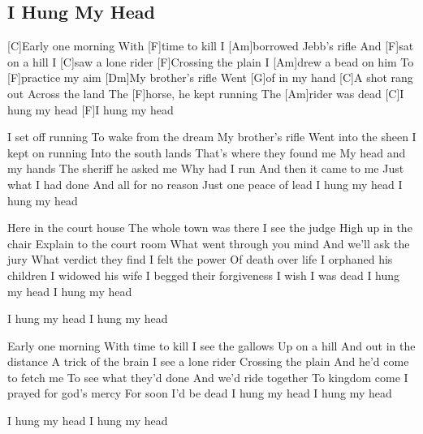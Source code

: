\subsection*{I Hung My Head   }

\begin{multicols}{2}

\begin{guitar}


[C]Early one morning
With [F]time to kill
I [Am]borrowed Jebb's rifle
And [F]sat on a hill
I [C]saw a lone rider
[F]Crossing the plain
I [Am]drew a bead on him
To [F]practice my aim
[Dm]My brother's rifle
Went [G]of in my hand
[C]A shot rang out
Across the land
The [F]horse, he kept running
The [Am]rider was dead
[C]I hung my head
[F]I hung my head


I set off running
To wake from the dream
My brother's rifle
Went into the sheen
I kept on running
Into the south lands
That's where they found me
My head and my hands
The sheriff he asked me
Why had I run
And then it came to me
Just what I had done
And all for no reason
Just one peace of lead
I hung my head
I hung my head
\columnbreak

Here in the court house
The whole town was there
I see the judge
High up in the chair
Explain to the court room
What went through you mind
And we'll ask the jury
What verdict they find
I felt the power
Of death over life
I orphaned his children
I widowed his wife
I begged their forgiveness
I wish I was dead
I hung my head
I hung my head

I hung my head
I hung my head

Early one morning
With time to kill
I see the gallows
Up on a hill
And out in the distance
A trick of the brain
I see a lone rider
Crossing the plain
And he'd come to fetch me
To see what they'd done
And we'd ride together
To kingdom come
I prayed for god's mercy
For soon I'd be dead
I hung my head
I hung my head

I hung my head
I hung my head
\end{guitar}
\end{multicols}
